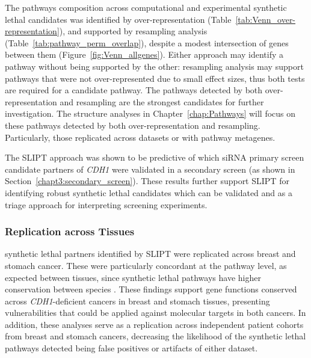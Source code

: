 The \glspl{pathway} composition across computational and experimental \gls{synthetic lethal} candidates was identified by over-represent\-ation (Table~\ref{tab:Venn_over-representation}), and supported by resampling analysis (Table~\ref{tab:pathway_perm_overlap}), despite a modest intersection of genes between them (Figure~\ref{fig:Venn_allgenes}). Either approach may identify a \gls{pathway} without being supported by the other: resampling analysis may support \glspl{pathway} that were not over-represent\-ed due to small effect sizes, thus both tests are required for a candidate \gls{pathway}.
%
The \glspl{pathway} detected by both over-represent\-ation and resampling are the strongest candidates for further investigation. The  structure analyses in Chapter~\ref{chap:Pathways} will focus on these \glspl{pathway} detected by both over-representation and resampling. Particularly, those replicated across datasets or with \gls{pathway} \glspl{metagene}. %

The \gls{SLIPT} approach was shown to be predictive of which \gls{siRNA} primary screen candidate partners of \textit{CDH1} were validated in a secondary screen (as shown in Section~\ref{chapt3:secondary_screen}). These results further support \gls{SLIPT} for identifying robust \gls{synthetic lethal} candidates which can be validated and as a triage approach for interpreting screening experiments.

\subsubsection{Replication across Tissues}

\Gls{synthetic lethal} partners identified by \gls{SLIPT} were replicated across breast and stomach cancer. These were particularly concordant at the \gls{pathway} level, as expected between tissues, since \gls{synthetic lethal} \glspl{pathway} have higher conservation between species \citep{Dixon2008}. These findings support gene functions conserved across \textit{CDH1}-deficient cancers in breast and stomach tissues, presenting vulnerabilities that could be applied against molecular targets in both cancers. In addition, these analyses serve as a replication across independent patient cohorts from breast and stomach cancers, decreasing the likelihood of the \gls{synthetic lethal} \glspl{pathway} detected being false positives or artifacts of either dataset.

